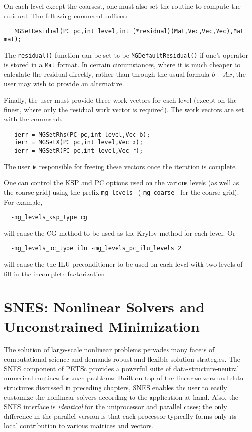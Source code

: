 On each level except the coarsest, one must also set the routine to 
compute the residual.  The following command suffices: 
\begin{verbatim}
   MGSetResidual(PC pc,int level,int (*residual)(Mat,Vec,Vec,Vec),Mat mat);
\end{verbatim}
The {\tt residual()} function can be set to be {\tt MGDefaultResidual()}
if 
one's operator is stored in a {\tt Mat} format.  In certain circumstances, 
where it is much cheaper to calculate the residual directly, rather 
than through the usual formula $b - Ax$,  the user may wish to provide 
an alternative. 

Finally, the user must provide three work vectors for each level 
(except on the finest, where only the residual work vector is required).
The work vectors are set with the 
commands    
\begin{verbatim}
   ierr = MGSetRhs(PC pc,int level,Vec b);
   ierr = MGSetX(PC pc,int level,Vec x);
   ierr = MGSetR(PC pc,int level,Vec r);
\end{verbatim}
The user is responsible for freeing these vectors once the iteration 
is complete.

One can control the KSP and PC options used on the various levels
(as well as the coarse grid) using the prefix {\tt mg\_levels\_} (
{\tt mg\_coarse\_} for the coarse grid).
 For example,
\begin{verbatim}
  -mg_levels_ksp_type cg
\end{verbatim}
will cause the CG method to be used as the Krylov method for each level.
Or
\begin{verbatim}
  -mg_levels_pc_type ilu -mg_levels_pc_ilu_levels 2
\end{verbatim}
will cause the the ILU preconditioner to be used on each level with 
two levels of fill in the incomplete factorization.


\chapter{SNES: Nonlinear Solvers and Unconstrained Minimization}
\label{chapter:snes}

The solution of large-scale nonlinear problems pervades many facets of
computational science and demands robust and flexible solution
strategies. The SNES component of PETSc provides a powerful suite of
data-structure-neutral numerical routines for such problems.  Built on
top of the linear solvers and data structures discussed in preceding
chapters, SNES enables the user to easily customize the nonlinear
solvers according to the application at hand.  Also, the SNES
interface is {\em identical} for the uniprocessor and parallel cases;
the only difference in the parallel version is that each processor
typically forms only its local contribution to various matrices and
vectors.

